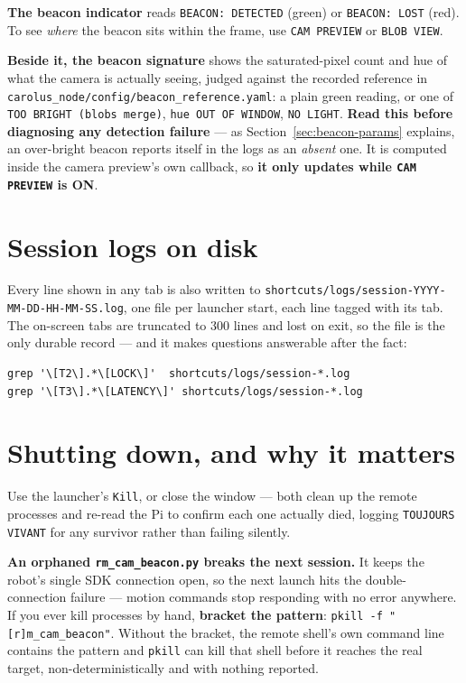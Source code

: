 \documentclass[11pt]{report}
\newenvironment{warningbox}%
  {\begin{lrbox}{\warnbox}\begin{minipage}{0.90\textwidth}}%
  {\end{minipage}\end{lrbox}%
   \begin{center}\fcolorbox{black}{codebg}{\usebox{\warnbox}}\end{center}}
\begin{document}
\textbf{The beacon indicator} reads \texttt{BEACON: DETECTED} (green) or
\texttt{BEACON: LOST} (red). To see \emph{where} the beacon sits within the
frame, use \texttt{CAM PREVIEW} or \texttt{BLOB VIEW}.

\textbf{Beside it, the beacon signature} shows the saturated-pixel count and
hue of what the camera is actually seeing, judged against the recorded
reference in \texttt{carolus\_node/config/beacon\_reference.yaml}: a plain
green reading, or one of \texttt{TOO BRIGHT (blobs merge)},
\texttt{hue OUT OF WINDOW}, \texttt{NO LIGHT}. \textbf{Read this before
diagnosing any detection failure} --- as
Section~\ref{sec:beacon-params} explains, an over-bright beacon reports
itself in the logs as an \emph{absent} one. It is computed inside the camera
preview's own callback, so \textbf{it only updates while \texttt{CAM PREVIEW}
is ON}.

\section{Session logs on disk}

Every line shown in any tab is also written to
\texttt{shortcuts/logs/session-YYYY-MM-DD-HH-MM-SS.log}, one file per
launcher start, each line tagged with its tab. The on-screen tabs are
truncated to 300 lines and lost on exit, so the file is the only durable
record --- and it makes questions answerable after the fact:

\begin{lstlisting}[style=shell]
grep '\[T2\].*\[LOCK\]'  shortcuts/logs/session-*.log
grep '\[T3\].*\[LATENCY\]' shortcuts/logs/session-*.log
\end{lstlisting}

\section{Shutting down, and why it matters}

Use the launcher's \texttt{Kill}, or close the window --- both clean up the
remote processes and re-read the Pi to confirm each one actually died,
logging \texttt{TOUJOURS VIVANT} for any survivor rather than failing
silently.

\begin{warningbox}
\textbf{An orphaned \texttt{rm\_cam\_beacon.py} breaks the next session.}
It keeps the robot's single SDK connection open, so the next launch hits
the double-connection failure --- motion commands stop responding with no
error anywhere. If you ever kill processes by hand, \textbf{bracket the
pattern}: \texttt{pkill -f "[r]m\_cam\_beacon"}. Without the bracket, the
remote shell's own command line contains the pattern and \texttt{pkill}
can kill that shell before it reaches the real target, non-deterministically
and with nothing reported.
\end{warningbox}
\end{document}

